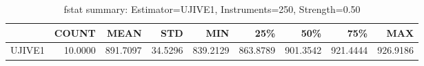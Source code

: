 \begin{table}[ht]
\centering
\caption{fstat summary: Estimator=UJIVE1, Instruments=250, Strength=0.50}
\begin{tabular}{lrrrrrrrr}
\toprule
 & COUNT & MEAN & STD & MIN & 25\% & 50\% & 75\% & MAX \\
\midrule
UJIVE1 & 10.0000 & 891.7097 & 34.5296 & 839.2129 & 863.8789 & 901.3542 & 921.4444 & 926.9186 \\
\bottomrule
\end{tabular}
\end{table}
